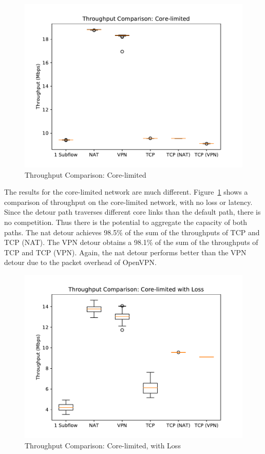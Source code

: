 \documentclass{cwru}
\begin{document}
\begin{figure}[htbp]
  \centering
  \includegraphics[height=0.42\textheight]{figures/easy.pdf}
  \caption{Throughput Comparison: Core-limited}
  \label{fig:easy}
\end{figure}

The results for the core-limited network are much different.
Figure~\ref{fig:easy} shows a comparison of throughput on the core-limited
network, with no loss or latency. Since the detour path traverses different core
links than the default path, there is no competition. Thus there is the
potential to aggregate the capacity of both paths. The \ac{nat} detour achieves
98.5\% of the sum of the throughputs of TCP and TCP (NAT). The VPN detour
obtains a 98.1\% of the sum of the throughputs of TCP and TCP (VPN). Again, the
\ac{nat} detour performs better than the VPN detour due to the packet overhead
of OpenVPN.

\begin{figure}[htbp]
  \centering
  \includegraphics[height=0.42\textheight]{figures/lossy.pdf}
  \caption{Throughput Comparison: Core-limited, with Loss}
  \label{fig:lossy}
\end{figure}
\end{document}
